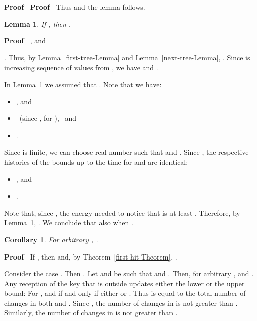 \documentclass{article}
\newenvironment{proof}{\noindent\textbf{Proof\ }}{\hspace*{\fill}\medskip}
\newtheorem{corollary}{Corollary}
\newtheorem{lemma}{Lemma}
\begin{document}
\begin{proof}
\begin{proof}
Thus  and the lemma follows.
  \end{proof}
  
  \begin{lemma}
    \label{total-Lemma} If ,
    then .
  \end{lemma}
  
  \begin{proof}
   , and 

. Thus, by Lemma~\ref{first-tree-Lemma}
    and Lemma~\ref{next-tree-Lemma}, . Since  is increasing
    sequence of values from , we have  and
    .
  \end{proof}
  
  In Lemma~\ref{total-Lemma} we assumed that . Note that we have:
  \begin{itemize}
    \item ,
    and
    
    \item  \ (since , for ), \ and
    
    \item .
  \end{itemize}
  Since  is
  finite, we can choose real number  such that
   and . Since  , the respective histories of the bounds
  up to the time  for  and 
  are identical:
  \begin{itemize}
    \item , and
    
    \item .
  \end{itemize}
  Note that, since , the
  energy needed to notice that 
  is at least .
  Therefore, by Lemma~\ref{total-Lemma}, . We
  conclude that  also when .
\end{proof}

\begin{corollary}
  \label{Corollary-ee}For arbitrary , .
\end{corollary}

\begin{proof}
 If , then  and, by
  Theorem~\ref{first-hit-Theorem}, .
  
  Consider the case .
  Then . Let  and  be such that
   and . Then, for arbitrary ,  and . Any reception of the key
  that is outside  updates either the lower or the upper
  bound: For ,  and  if and only
  if either  or . Thus  is equal to the total number of changes in both
   and .
  Since , the number of
  changes in  is not greater than .
  Similarly, the number of changes in  is
  not greater than .
\end{proof}
\end{document}
